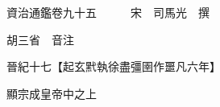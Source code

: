 










 


 
 


 

  
  
  
  
  





  
  
  
  
  
 
  

  

  
  
  



  

 
 

  
   




  

  
  


  　　資治通鑑卷九十五　　　宋　司馬光　撰

　　胡三省　音注

　　晉紀十七【起玄黓執徐盡彊圉作噩凡六年】

　　顯宗成皇帝中之上

